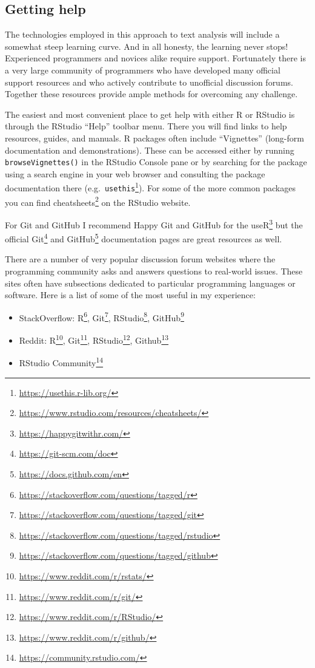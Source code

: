 \documentclass[
  letterpaper,
]{scrbook}
\providecommand{\tightlist}{%
  \setlength{\itemsep}{0pt}\setlength{\parskip}{0pt}}\usepackage{longtable,booktabs,array}
\DeclareRobustCommand{\href}[2]{#2\footnote{\url{#1}}}
\begin{document}
\hypertarget{getting-help}{%
\subsection*{Getting help}\label{getting-help}}

The technologies employed in this approach to text analysis will include
a somewhat steep learning curve. And in all honesty, the learning never
stops! Experienced programmers and novices alike require support.
Fortunately there is a very large community of programmers who have
developed many official support resources and who actively contribute to
unofficial discussion forums. Together these resources provide ample
methods for overcoming any challenge.

The easiest and most convenient place to get help with either R or
RStudio is through the RStudio ``Help'' toolbar menu. There you will
find links to help resources, guides, and manuals. R packages often
include ``Vignettes'' (long-form documentation and demonstrations).
These can be accessed either by running \texttt{browseVignettes()} in
the RStudio Console pane or by searching for the package using a search
engine in your web browser and consulting the package documentation
there (e.g.~\href{https://usethis.r-lib.org/}{\texttt{usethis}}). For
some of the more common packages you can find
\href{https://www.rstudio.com/resources/cheatsheets/}{cheatsheets} on
the RStudio website.

For Git and GitHub I recommend \href{https://happygitwithr.com/}{Happy
Git and GitHub for the useR} but the official
\href{https://git-scm.com/doc}{Git} and
\href{https://docs.github.com/en}{GitHub} documentation pages are great
resources as well.

There are a number of very popular discussion forum websites where the
programming community asks and answers questions to real-world issues.
These sites often have subsections dedicated to particular programming
languages or software. Here is a list of some of the most useful in my
experience:

\begin{itemize}
\tightlist
\item
  StackOverflow: \href{https://stackoverflow.com/questions/tagged/r}{R},
  \href{https://stackoverflow.com/questions/tagged/git}{Git},
  \href{https://stackoverflow.com/questions/tagged/rstudio}{RStudio},
  \href{https://stackoverflow.com/questions/tagged/github}{GitHub}
\item
  Reddit: \href{https://www.reddit.com/r/rstats/}{R},
  \href{https://www.reddit.com/r/git/}{Git},
  \href{https://www.reddit.com/r/RStudio/}{RStudio},
  \href{https://www.reddit.com/r/github/}{Github}
\item
  \href{https://community.rstudio.com/}{RStudio Community}
\end{itemize}
\end{document}
